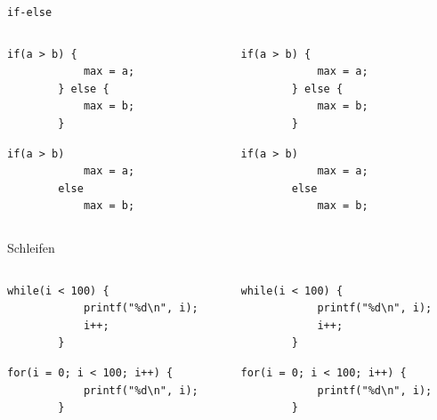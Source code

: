 \documentclass[10pt]{beamer} %
\begin{document}
\begin{frame}[fragile]{\texttt{if-else}}

	\begin{columns}
	\begin{column}{.4\textwidth}
	
	\begin{lstlisting}[gobble=4]
		if(a > b) {
			max = a;
		} else {
			max = b;
		}
	\end{lstlisting}
	
	\begin{lstlisting}[gobble=4]
		if(a > b)
			max = a;
		else
			max = b;
	\end{lstlisting}
	
	\end{column}
	\begin{column}{.4\textwidth}
	
	\begin{lstlisting}[gobble=4,showspaces,showtabs]
		if(a > b) {
			max = a;
		} else {
			max = b;
		}
	\end{lstlisting}
	
	\begin{lstlisting}[gobble=4,showspaces,showtabs]
		if(a > b)
			max = a;
		else
			max = b;
	\end{lstlisting}
	
	\end{column}
	\end{columns}
	
\end{frame}

\begin{frame}[fragile]{Schleifen}

	\begin{columns}
	\begin{column}{.4\textwidth}
	
	\begin{lstlisting}[gobble=4]
		while(i < 100) {
			printf("%d\n", i);
			i++;
		}
	\end{lstlisting}
	
	\begin{lstlisting}[gobble=4]
		for(i = 0; i < 100; i++) {
			printf("%d\n", i);
		}
	\end{lstlisting}
	
	\end{column}
	\begin{column}{.4\textwidth}
	
	\begin{lstlisting}[gobble=4,showspaces,showtabs]
		while(i < 100) {
			printf("%d\n", i);
			i++;
		}
	\end{lstlisting}
	
	\begin{lstlisting}[gobble=4,showspaces,showtabs]
		for(i = 0; i < 100; i++) {
			printf("%d\n", i);
		}
	\end{lstlisting}

	\end{column}
	\end{columns}
	
\end{frame}
\end{document}
